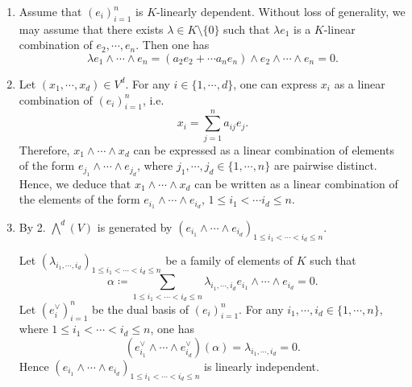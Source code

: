 \begin{proofenv}
    \quad
    \begin{enumerate}
        \item Assume that $\left(e_i\right)_{i=1}^{n}$ is $K$-linearly dependent.
        Without loss of generality, we may assume that there exists $\lambda \in K \setminus \{0\}$ such that $\lambda e_1$ is a $K$-linear combination of $e_2, \cdots, e_n$.
        Then one has
        $$ \lambda e_1 \wedge \cdots \wedge e_n = \left(a_2 e_2 + \cdots a_n e_n\right) \wedge e_2 \wedge \cdots \wedge e_n = 0.$$
        \item Let $(x_1,\cdots, x_d) \in V^d$.
        For any $i \in \{1,\cdots,d\}$, one can express $x_i$ as a linear combination of $\left(e_i\right)_{i=1}^n$, i.e.
        $$ x_i = \sum_{j=1}^n a_{ij} e_j.$$
        Therefore, $x_1 \wedge \cdots \wedge x_d$ can be expressed as a linear combination of elements of the form $e_{j_1} \wedge \cdots \wedge e_{j_d}$, where $j_1,\cdots,j_d \in \{1,\cdots,n\}$ are pairwise distinct.
        Hence, we deduce that $x_1 \wedge \cdots \wedge x_d$ can be written as a linear combination of the elements of the form $e_{i_1} \wedge \cdots \wedge e_{i_d}$, $1 \le i_1 < \cdots i_d \le n$.
        \item By 2. $\bigwedge^d (V)$ is generated by $\left(e_{i_1} \wedge \cdots \wedge e_{i_d}\right)_{1\le i_1 < \cdots < i_d \le n}$.
        
        Let $\left(\lambda_{i_1,\cdots , i_d}\right)_{1\le i_1 < \cdots <i_d\le n}$ be a family of elements of $K$ such that
        $$ \alpha \coloneq \sum_{1 \le i_1 < \cdots <i_d \le n} \lambda_{i_1,\cdots, i_d} e_{i_1} \wedge \cdots \wedge e_{i_d} = 0.$$
        Let $\left(e_{i}^\vee\right)_{i=1}^n$ be the dual basis of $\left(e_{i}\right)_{i=1}^n$.
        For any $i_1,\cdots,i_d \in \{1,\cdots,n\}$, where $1\le i_1 < \cdots < i_d\le n$, one has
        $$ \left(e_{i_1}^\vee \wedge \cdots \wedge e_{i_d}^\vee\right) \left(\alpha\right) = \lambda_{i_1,\cdots, i_d} = 0.$$
        Hence $\left(e_{i_1} \wedge \cdots \wedge e_{i_d}\right)_{1\le i_1 < \cdots < i_d \le n}$ is linearly independent.
    \end{enumerate}
\end{proofenv}

